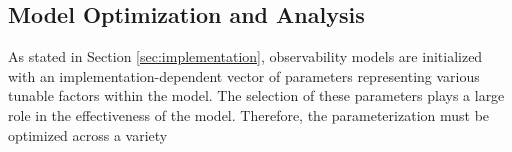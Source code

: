 \subsection{Model Optimization and Analysis}

As stated in Section \ref{sec:implementation}, observability models are initialized with an implementation-dependent vector of parameters representing various tunable factors within the model. The selection of these parameters plays a large role in the effectiveness of the model. Therefore, the parameterization must be optimized across a variety

\subsubsection{}